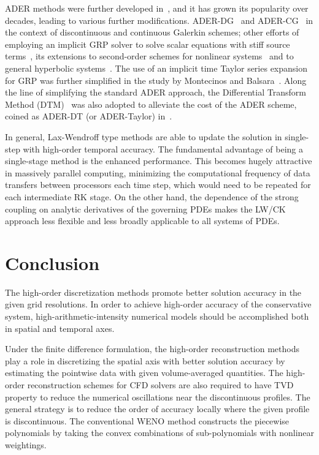 ADER methods were further developed in~\cite{toro2001towards,titarev2002ader,titarev2005ader},
and it has grown its popularity over decades,
leading to various further modifications.
ADER-DG~\cite{fambri2017space,zanotti2016efficient} and
ADER-CG~\cite{balsara2009efficient,balsara2013efficient,balsara2017higher}
in the context of discontinuous and continuous Galerkin schemes;
other efforts of employing
an implicit GRP solver
to solve  scalar equations 
with stiff source terms~\cite{montecinos2012solver},
its extensions to second-order schemes for 
nonlinear systems~\cite{montecinos2014reformulations}
and to general hyperbolic systems~\cite{toro2015implicit}.
The use of an implicit time Taylor series expansion for GRP
was further simplified
in the study by Montecinos and Balsara~\cite{montecinos2020simplified}.
Along the line of simplifying the standard ADER approach,
the Differential Transform Method (DTM)~\cite{chen1996application}
was also adopted to alleviate
the cost of the ADER scheme, coined as ADER-DT (or ADER-Taylor)
in~\cite{norman2012multi,norman2013algorithmic,norman2014weno}.

In general, Lax-Wendroff type methods are able to update the solution
in single-step with high-order temporal accuracy.
The fundamental advantage of being a single-stage method is the enhanced performance.
This becomes hugely attractive in massively parallel computing, minimizing the computational frequency
of data transfers between processors each time step, which would need to be repeated for each intermediate RK stage.
On the other hand, the dependence of the strong coupling on analytic derivatives
of the governing PDEs makes the LW/CK approach less flexible and less broadly applicable to all systems of PDEs.





\section{Conclusion}\label{sec:high_order_conclusion}

The high-order discretization methods promote better solution accuracy in the given grid resolutions.
In order to achieve high-order accuracy of the conservative system,
high-arithmetic-intensity numerical models should be accomplished
both in spatial and temporal axes.

Under the finite difference formulation,
the high-order reconstruction methods play a role in discretizing the spatial axis
with better solution accuracy by estimating the pointwise data with given volume-averaged quantities.
The high-order reconstruction schemes for CFD solvers are also required to have TVD property
to reduce the numerical oscillations near the discontinuous profiles.
The general strategy is to reduce the order of accuracy locally where the given profile is discontinuous.
The conventional WENO method constructs
the piecewise polynomials by taking the convex combinations of sub-polynomials with nonlinear weightings.

